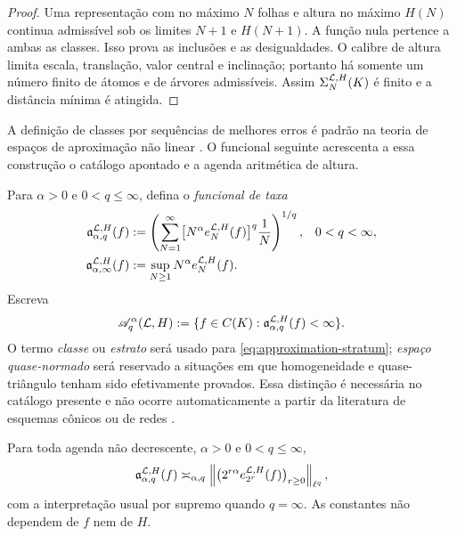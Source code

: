 \begin{proof}
Uma representação com no máximo $N$ folhas e altura no máximo $H(N)$
continua admissível sob os limites $N+1$ e $H(N+1)$. A função nula pertence
a ambas as classes. Isso prova as inclusões e as desigualdades. O calibre de
altura limita escala, translação, valor central e inclinação; portanto há
somente um número finito de átomos e de árvores admissíveis. Assim
$\Sigma_N^{\mathcal{L},H}(K)$ é finito e a distância mínima é atingida.
\end{proof}

A definição de classes por sequências de melhores erros é padrão na teoria de
espaços de aproximação não linear \citep{devore1998}. O funcional seguinte
acrescenta a essa construção o catálogo apontado e a agenda aritmética de
altura.

Para $\alpha>0$ e $0<q\le\infty$, defina o \emph{funcional de taxa}
\begin{align}
 \mathfrak a_{\alpha,q}^{\mathcal{L},H}(f)
 &:=\left(\sum_{N=1}^{\infty}
       \bigl[N^\alpha e_N^{\mathcal{L},H}(f)\bigr]^q\frac1N
       \right)^{1/q}, &&0<q<\infty,
 \label{eq:rate-functional-finite}\\
 \mathfrak a_{\alpha,\infty}^{\mathcal{L},H}(f)
 &:=\sup_{N\ge1}N^\alpha e_N^{\mathcal{L},H}(f).
 \label{eq:rate-functional-infty}
\end{align}
Escreva
\begin{equation}
 \mathscr A_{q}^{\alpha}(\mathcal{L},H)
 :=\{f\in C(K):\mathfrak a_{\alpha,q}^{\mathcal{L},H}(f)<\infty\}.
 \label{eq:approximation-stratum}
\end{equation}
O termo \emph{classe} ou \emph{estrato} será usado para
\eqref{eq:approximation-stratum}; \emph{espaço quase-normado} será reservado
a situações em que homogeneidade e quase-triângulo tenham sido efetivamente
provados. Essa distinção é necessária no catálogo presente e não ocorre
automaticamente a partir da literatura de esquemas cônicos ou de redes
\citep{gribonval2022,grohs2023}.

\begin{theorem}
\label{thm:dyadic-rate-equivalence}
Para toda agenda não decrescente, $\alpha>0$ e $0<q\le\infty$,
\begin{equation}
 \mathfrak a_{\alpha,q}^{\mathcal{L},H}(f)
 \asymp_{\alpha,q}
 \left\|\bigl(2^{r\alpha}
 e_{2^r}^{\mathcal{L},H}(f)\bigr)_{r\ge0}\right\|_{\ell^q},
 \label{eq:dyadic-rate-equivalence}
\end{equation}
com a interpretação usual por supremo quando $q=\infty$. As constantes não
dependem de $f$ nem de $H$.
\end{theorem}

